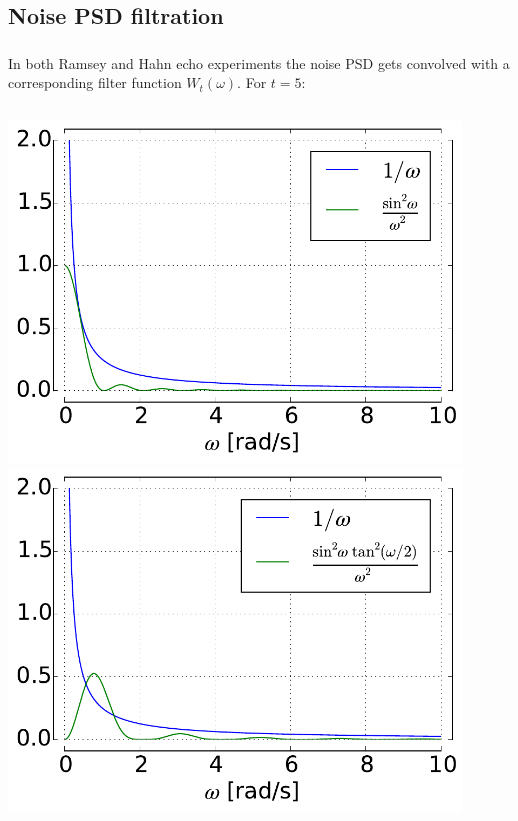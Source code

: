 \documentclass[aspectratio=169, 13pt, t]{beamer}
\begin{document}
\subsection{Noise PSD filtration}
\begin{frame}[t]\frametitle{\secname}\framesubtitle{\subsecname}
In both Ramsey and Hahn echo experiments the noise PSD gets convolved with a corresponding filter function $W_t(\omega)$. For $t=5$:

\vspace{0.5cm}
\begin{columns}[c]
\centering\includegraphics[width=0.9\textwidth]{ramsey_filter}
\centering\includegraphics[width=0.9\textwidth]{hahn_filter}
\end{columns}

\end{frame}
\end{document}
